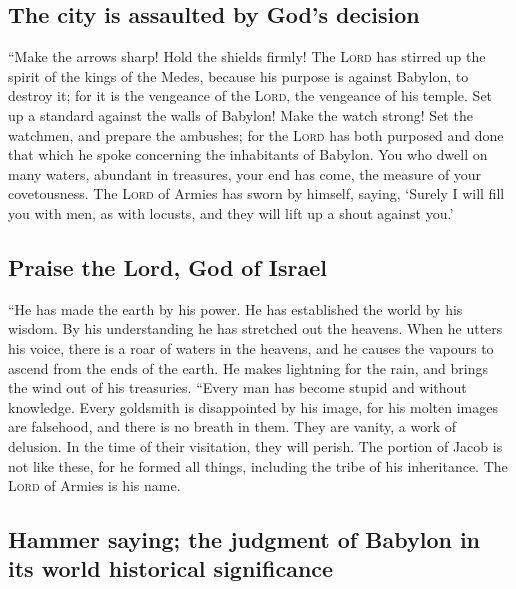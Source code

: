 \hypertarget{the-city-is-assaulted-by-gods-decision}{%
\subsection{The city is assaulted by God's
decision}\label{the-city-is-assaulted-by-gods-decision}}

 ``Make the arrows sharp! Hold the shields firmly! The
\textsc{Lord} has stirred up the spirit of the kings of the Medes,
because his purpose is against Babylon, to destroy it; for it is the
vengeance of the \textsc{Lord}, the vengeance of his temple.
 Set up a standard against the walls of Babylon! Make the
watch strong! Set the watchmen, and prepare the ambushes; for the
\textsc{Lord} has both purposed and done that which he spoke concerning
the inhabitants of Babylon.  You who dwell on many
waters, abundant in treasures, your end has come, the measure of your
covetousness.  The \textsc{Lord} of Armies has sworn by
himself, saying, `Surely I will fill you with men, as with locusts, and
they will lift up a shout against you.'

\hypertarget{praise-the-lord-god-of-israel}{%
\subsection{Praise the Lord, God of
Israel}\label{praise-the-lord-god-of-israel}}

 ``He has made the earth by his power. He has established
the world by his wisdom. By his understanding he has stretched out the
heavens.  When he utters his voice, there is a roar of
waters in the heavens, and he causes the vapours to ascend from the ends
of the earth. He makes lightning for the rain, and brings the wind out
of his treasuries.  ``Every man has become stupid and
without knowledge. Every goldsmith is disappointed by his image, for his
molten images are falsehood, and there is no breath in them.
 They are vanity, a work of delusion. In the time of
their visitation, they will perish.  The portion of Jacob
is not like these, for he formed all things, including the tribe of his
inheritance. The \textsc{Lord} of Armies is his name.

\hypertarget{hammer-saying-the-judgment-of-babylon-in-its-world-historical-significance}{%
\subsection{Hammer saying; the judgment of Babylon in its world
historical
significance}\label{hammer-saying-the-judgment-of-babylon-in-its-world-historical-significance}}

